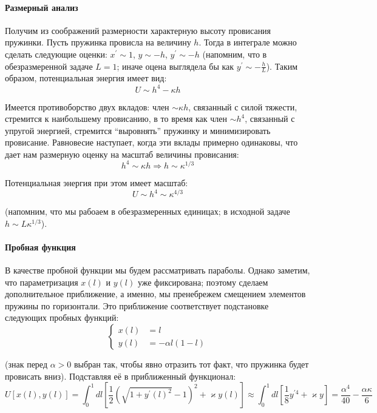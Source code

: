 \documentclass[a4paper,12pt]{article}
\begin{document}
\paragraph{Размерный анализ}

Получим из соображений размерности характерную высоту провисания пружинки.
Пусть пружинка провисла на величину $h$. Тогда в интеграле можно
сделать следующие оценки: $x^{\prime}\sim1$, $y\sim-h$, $y^{\prime}\sim-h$
(напомним, что в обезразмеренной задаче $L=1$; иначе оцена выглядела
бы как $y^{\prime}\sim-\frac{h}{L}$). Таким образом, потенциальная
энергия имеет вид:
\[
U\sim h^{4}-\kappa h
\]

\noindent
Имеется противоборство двух вкладов: член $\sim\kappa h$, связанный
с силой тяжести, стремится к наибольшему провисанию, в то время как
член $\sim h^{4}$, связанный с упругой энергией, стремится ``выровнять''
пружинку и минимизировать провисание. Равновесие наступает, когда
эти вклады примерно одинаковы, что дает нам размерную оценку на масштаб
величины провисания:
\[
h^{4}\sim\kappa h\Rightarrow h\sim\kappa^{1/3}
\]

\noindent
Потенциальная энергия при этом имеет масштаб:
\[
U\sim h^{4}\sim\kappa^{4/3}
\]

\noindent
(напомним, что мы рабоаем в обезразмеренных единицах; в исходной задаче
$h\sim L\kappa^{1/3}$). 


\paragraph{Пробная функция}

В качестве пробной функции мы будем рассматривать параболы. Однако
заметим, что параметризация $x(l)$ и $y(l)$ уже фиксирована; поэтому
сделаем дополнительное приближение, а именно, мы пренебрежем смещением
элементов пружины по горизонтали. Это приближение соответствует подстановке
следующих пробных функций: 
\[
\begin{cases}
x(l) & =l\\
y(l) & =-\alpha l(1-l)
\end{cases}
\]

\noindent
(знак перед $\alpha>0$ выбран так, чтобы явно отразить тот факт,
что пружинка будет провисать вниз). Подставляя её в приближенный функционал:
\[
U[x(l),y(l)]=\int_{0}^{1}dl\left[\frac{1}{2}\left(\sqrt{1+y^{\prime}(l)^{2}}-1\right)^{2}+\varkappa y(l)\right]
\approx\int_{0}^{1}dl\left[\frac{1}{8}y^{\prime4}+\varkappa y\right]=\frac{\alpha^{4}}{40}-\frac{\alpha\kappa}{6}
\]
\end{document}
